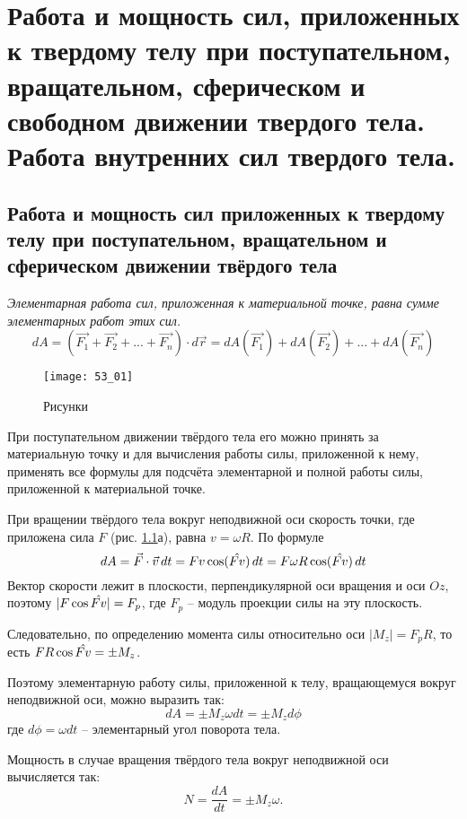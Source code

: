\chapter{Работа и мощность сил, приложенных к твердому телу при поступательном,
вращательном, сферическом и свободном движении твердого тела. Работа
внутренних сил твердого тела.}

\section{Работа и мощность сил приложенных к твердому телу при поступательном, 
вращательном и сферическом движении твёрдого тела}

\emph{Элементарная работа сил, приложенная к материальной точке, равна сумме 
элементарных работ этих сил.}
\[ 
	dA = \left( \vec{F_1} + \vec{F_2} + ... + \vec{F_n} \right)\cdot d\vec{r} =
	dA(\vec{F_1}) + dA(\vec{F_2}) + ... + dA(\vec{F_n})
\]

\begin{figure}[h!]
	\center
    \texttt{[image: 53\_01]}
    \caption{Рисунки}
    \label{pic53_01}
\end{figure}

При поступательном движении твёрдого тела его можно принять за материальную 
точку и для вычисления работы силы, приложенной к нему, применять все 
формулы для подсчёта элементарной и полной работы силы, приложенной к 
материальной точке.

При вращении твёрдого тела вокруг неподвижной оси скорость точки, где приложена 
сила \( F \) (рис. \ref{pic53_01}а), равна \( v = \omega R \). По формуле
\[ 
	dA = \vec{F}\cdot\vec{v}\,dt = Fv\cos(\hat{Fv})\,dt = 
	F\omega R\cos(\Hat{Fv})\,dt
\]
Вектор скорости лежит в плоскости, перпендикулярной оси вращения и оси \( Oz \), 
поэтому \( |F\cos\Hat{Fv}| = F_p \), где \( F_p \) -- модуль проекции силы на эту 
плоскость. 

Следовательно, по определению момента силы относительно оси 
\( |M_z| = F_p R\), то есть \( FR\cos\Hat{Fv} = \pm M_z \).

Поэтому элементарную работу силы, приложенной к телу, вращающемуся вокруг 
неподвижной оси, можно выразить так:
\[
	dA = \pm M_z\omega dt = \pm M_zd\phi
\]
где \( d\phi = \omega dt \) -- элементарный угол поворота тела.

Мощность в случае вращения твёрдого тела вокруг неподвижной оси 
вычисляется так:
\[
	N = \frac{dA}{dt} = \pm M_z\omega.
\]

